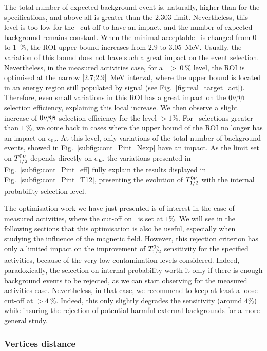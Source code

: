 The total number of expected background event is, naturally, higher than for the specifications, and above all is greater than the $2.303$ limit.
Nevertheless, this level is too low for the \Pint\ cut-off to have an impact, and the number of expected background remains constant.
When the minimal acceptable \Pint\ is changed from $0$ to $1$~\%, the ROI upper bound increases from $2.9$ to $3.05$~MeV.
Usually, the variation of this bound does not have such a great impact on the event selection.
Nevertheless, in the measured activities case, for a \Pint~$>~0~\%$ level, the ROI is optimised at the narrow [$2.7$;$2.9$]~MeV interval, where the upper bound is located in an energy region still populated by signal (see Fig.~\ref{fig:real_target_act}).
Therefore, even small variations in this ROI has a great impact on the $0\nu\beta\beta$ selection efficiency, explaining this local increase.
We then observe a slight increase of $0\nu\beta\beta$ selection efficiency for the level \Pint$>1\%$.
For \Pint\ selections greater than $1~\%$, we come back in cases where the upper bound of the ROI no longer has an impact on $\epsilon_{0\nu}$.
At this level, only variations of the total number of background events, showed in Fig.~\ref{subfig:cont_Pint_Nexp} have an impact.
As the limit set on $T_{1/2}^{0\nu}$ depends directly on $\epsilon_{0\nu}$, the variations presented in Fig.~\ref{subfig:cont_Pint_eff} fully explain the results displayed in Fig.~\ref{subfig:cont_Pint_T12}, presenting the evolution of $T_{1/2}^{0\nu}$ with the internal probability selection level.

The optimisation work we have just presented is of interest in the case of measured activities, where the cut-off on \Pint\ is set at $1$\%.
We will see in the following sections that this optimisation is also be useful, especially when studying the influence of the magnetic field.
However, this rejection criterion has only a limited impact on the improvement of $T_{1/2}^{0\nu}$ sensitivity for the specified activities, because of the very low contamination levels considered.
Indeed, paradoxically, the selection on internal probability worth it only if there is enough background events to be rejected, as we can start observing for the measured activities case.
Nevertheless, in that case, we recommend to keep at least a loose cut-off at \Pint$>4~\%$.
Indeed, this only slightly degrades the sensitivity (around $4$\%) while insuring the rejection of potential harmful external backgrounds for a more general study.



\subsubsection{Vertices distance}

